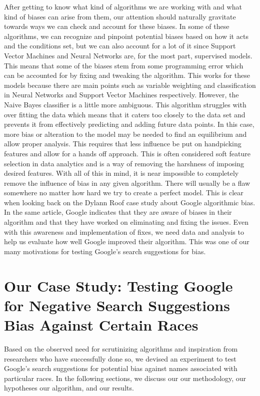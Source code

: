 \documentclass[sigconf]{acmart}
\begin{document}
After getting to know what kind of algorithms we are working with and what kind of biases can arise from them, our attention should naturally gravitate towards ways we can check and account for these biases. In some of these algorithms, we can recognize and pinpoint potential biases based on how it acts and the conditions set, but we can also account for a lot of it since Support Vector Machines and Neural Networks are, for the most part, supervised models. This means that some of the biases stem from some programming error which can be accounted for by fixing and tweaking the algorithm. This works for these models because there are main points such as variable weighting and classification in Neural Networks and Support Vector Machines respectively. However, the Naive Bayes classifier is a little more ambiguous. This algorithm struggles with over fitting the data which means that it caters too closely to the data set and prevents it from effectively predicting and adding future data points. In this case, more bias or alteration to the model may be needed to find an equilibrium and allow proper analysis. This requires that less influence be put on handpicking features and allow for a hands off approach. This is often considered soft feature selection in data analytics and is a way of removing the harshness of imposing desired features. With all of this in mind, it is near impossible to completely remove the influence of bias in any given algorithm. There will usually be a flaw somewhere no matter how hard we try to create a perfect model. This is clear when looking back on the Dylann Roof case study about Google algorithmic bias. In the same article, Google indicates that they are aware of biases in their algorithm and that they have worked on eliminating and fixing the issues\cite{Hersher2017}. Even with this awareness and implementation of fixes, we need data and analysis to help us evaluate how well Google improved their algorithm. This was one of our many motivations for testing Google's search suggestions for bias.

\section{Our Case Study: Testing Google for Negative Search Suggestions Bias Against Certain Races}

Based on the observed need for scrutinizing algorithms and inspiration from researchers who have successfully done so, we devised an experiment to test Google's search suggestions for potential bias against names associated with particular races. In the following sections, we discuss our our methodology, our hypotheses our algorithm, and our results.
\end{document}
